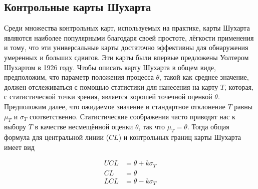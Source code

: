 \subsection{Контрольные карты Шухарта}
Среди множества контрольных карт, используемых на практике, карты Шухарта являются наиболее популярными благодаря своей простоте, лёгкости применения и тому, что эти универсальные карты достаточно эффективны для обнаружения умеренных и больших сдвигов. Эти карты были впервые предложены Уолтером Шухартом в 1926 году. Чтобы описать карту Шухарта в общем виде, предположим, что параметр положения процесса \(\theta\), такой как среднее значение, должен отслеживаться с помощью статистики для нанесения на карту \(T\), которая, с статистической точки зрения, является хорошей точечной оценкой \(\theta\). Предположим далее, что ожидаемое значение и стандартное отклонение \(T\) равны \(\mu_T\) и \(\sigma_T\) соответственно. Статистические соображения часто приводят нас к выбору \(T\) в качестве несмещённой оценки \(\theta\), так что \(\mu_T = \theta\). Тогда общая формула для центральной линии (\(CL\)) и контрольных границ карты Шухарта имеет вид

\begin{equation}
	\begin{aligned}
		UCL &= \theta + k\sigma_T \\
		CL &= \theta \\
		LCL &= \theta - k\sigma_T
	\end{aligned}
	\label{eq:3.1}
\end{equation}


